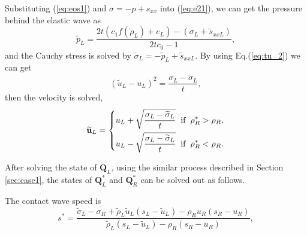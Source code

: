 \documentclass[review]{elsarticle}
\begin{document}
Substituting (\ref{eq:eos1}) and $\sigma=-p +s_{xx}$ into (\ref{eq:e21}), we can get the pressure behind the elastic wave as
\begin{equation}
  \widetilde{p}_L= \frac{2t(c_1f(\widetilde{\rho}_L)+e_L)-(\sigma_L+\widetilde{s}_{xxL})}{2tc_0-1},
\end{equation}
and the Cauchy stress is solved by $\widetilde{\sigma}_L = -\widetilde{p}_L+\widetilde{s}_{xxL}$. By using Eq.(\ref{eq:tu_2}) we can get
\begin{equation}
  (\widetilde{u}_L-u_L)^2 = \frac{\sigma_L-\widetilde{\sigma}_L}{t},
\end{equation}
then the velocity is solved,
\begin{equation}
  \widetilde{\mathbf{u}}_L= \left\{
  \begin{aligned}
    u_L+\sqrt{\frac{\sigma_L-\widetilde{\sigma}_L}{t}} \hspace{0.2cm} \text{if} \hspace{0.2cm} \rho_R^* >\rho_R,\\
    u_L-\sqrt{\frac{\sigma_L-\widetilde{\sigma}_L}{t}} \hspace{0.2cm} \text{if} \hspace{0.2cm} \rho_R^* <\rho_R.\\
\end{aligned} \right.
\end{equation}

After solving  the state of $\widetilde{\mathbf{Q}}_L$,  using the similar process described in Section \ref{sec:case1}, the states of $\mathbf{Q}_L^*$ and $\mathbf{Q}_R^*$ can be solved  out as follows.

The contact wave speed is
\begin{equation}
  s^* = \frac{\widetilde{\sigma}_L-\sigma_R+\widetilde{\rho}_L \widetilde{u}_L(s_L-\widetilde{u}_L)-\rho_R u_R(s_R-u_R)}{\widetilde{\rho}_L(s_L-\widetilde{u}_L)-\rho_R(s_R-u_R)},
\end{equation}
\end{document}
